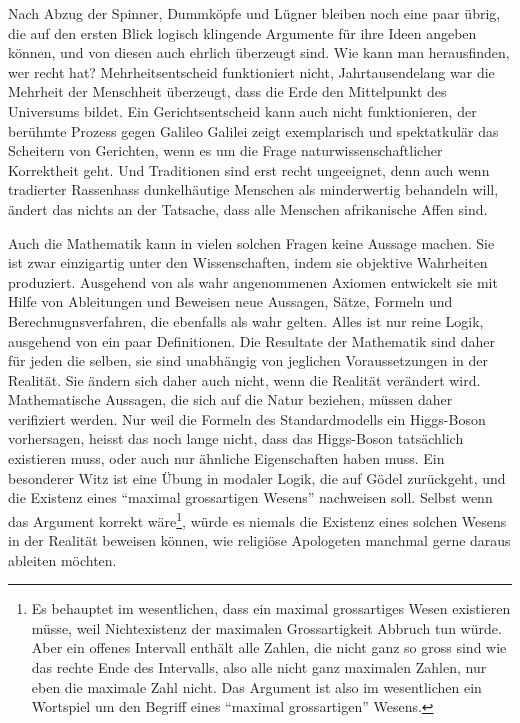 Nach Abzug der Spinner, Dummköpfe und Lügner bleiben noch eine
paar übrig, die auf den ersten Blick logisch klingende Argumente
für ihre Ideen angeben können, und von diesen auch ehrlich 
überzeugt sind.
Wie kann man herausfinden, wer recht hat?
Mehrheitsentscheid funktioniert nicht, Jahrtausendelang war
die Mehrheit der Menschheit überzeugt, dass die Erde den Mittelpunkt
des Universums bildet.
Ein Gerichtsentscheid kann auch nicht funktionieren, der berühmte
Prozess gegen Galileo Galilei zeigt exemplarisch und spektatkulär
das Scheitern von Gerichten, wenn es um die Frage naturwissenschaftlicher
Korrektheit geht.
Und Traditionen sind erst recht ungeeignet, denn auch wenn tradierter Rassenhass
dunkelhäutige Menschen als minderwertig behandeln will, ändert das
nichts an der Tatsache, dass alle Menschen afrikanische Affen sind.

Auch die Mathematik kann in vielen solchen Fragen keine Aussage machen.
Sie ist zwar einzigartig unter den Wissenschaften, indem
sie objektive Wahrheiten produziert.
Ausgehend von als wahr angenommenen Axiomen entwickelt sie mit 
Hilfe von Ableitungen und Beweisen neue Aussagen, Sätze, Formeln
und Berechnugnsverfahren, die ebenfalls als wahr gelten.
Alles ist nur reine Logik, ausgehend von ein paar Definitionen.
Die Resultate der Mathematik sind daher für jeden die selben, 
sie sind unabhängig von jeglichen Voraussetzungen in der Realität.
Sie ändern sich daher auch nicht, wenn die Realität verändert wird.
Mathematische Aussagen, die sich auf die Natur beziehen, müssen daher
verifiziert werden.
Nur weil die Formeln des Standardmodells ein Higgs-Boson vorhersagen,
heisst das noch lange nicht, dass das Higgs-Boson tatsächlich existieren
muss, oder auch nur ähnliche Eigenschaften haben muss.
Ein besonderer Witz ist eine Übung in modaler Logik, die auf Gödel
zurückgeht, und die Existenz eines ``maximal grossartigen Wesens'' 
nachweisen soll. 
Selbst wenn das Argument korrekt wäre\footnote{Es behauptet im wesentlichen,
dass ein maximal grossartiges Wesen existieren müsse, weil Nichtexistenz
der maximalen Grossartigkeit Abbruch tun würde.
Aber ein offenes Intervall enthält alle Zahlen, die nicht ganz so gross
sind wie das rechte Ende des Intervalls, also alle nicht ganz maximalen
Zahlen, nur eben die maximale Zahl nicht.
Das Argument ist also im wesentlichen ein Wortspiel um den Begriff eines
``maximal grossartigen'' Wesens.}, würde es niemals die Existenz eines
solchen Wesens in der Realität beweisen können, wie religiöse
Apologeten manchmal gerne daraus ableiten möchten.

